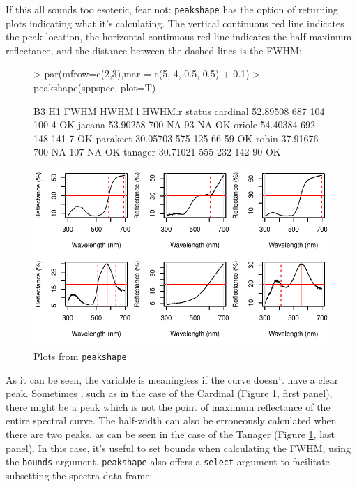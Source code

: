 \documentclass{article}
\newcommand{\code}[1]{{\tt #1}}  %
\begin{document}
If this all sounds too esoteric, fear not: \code{peakshape} has the option of returning plots indicating what it's calculating. The vertical continuous red line indicates the peak location, the horizontal continuous red line indicates the half-maximum reflectance, and the distance between the dashed lines is the FWHM:

\begin{figure}[H] %
\begin{center}
\begin{Schunk}
\begin{Sinput}
> par(mfrow=c(2,3),mar = c(5, 4, 0.5, 0.5) + 0.1)
> peakshape(sppspec, plot=T)
\end{Sinput}
\begin{Soutput}
               B3  H1 FWHM HWHM.l HWHM.r status
cardinal 52.89508 687  104    100      4     OK
jacana   53.90258 700   NA     93     NA     OK
oriole   54.40384 692  148    141      7     OK
parakeet 30.05703 575  125     66     59     OK
robin    37.91676 700   NA    107     NA     OK
tanager  30.71021 555  232    142     90     OK
\end{Soutput}
\end{Schunk}
\includegraphics{pavo-fwhm}
\end{center}
\caption{Plots from \code{peakshape}}
\label{figure:fwhm}
\end{figure}

As it can be seen, the variable is meaningless if the curve doesn't have a clear peak. Sometimes
, such as in the case of the Cardinal (Figure \ref{figure:fwhm}, first panel), there might be a 
peak which is not the point of maximum reflectance of the entire spectral curve. The half-width 
can also be erroneously calculated when there are two peaks, as can be seen in the case of the 
Tanager (Figure \ref{figure:fwhm}, last panel). In this case, it's useful to set bounds when 
calculating the FWHM, using the \code{bounds} argument. \code{peakshape} also offers a 
\code{select} argument to facilitate subsetting the spectra data frame:
\end{document}
